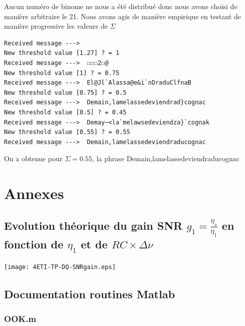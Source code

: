 \documentclass{article}
\begin{document}
\newline
Aucun numéro de binome ne nous a été distribué donc nous avons choisi de manière arbitraire le 21. \newline
Nous avons agis de manière empirique en testant de manière progressive les valeurs de $\Sigma$

\begin{verbatim}
Received message ---> 
New threshold value [1.27] ? = 1
Received message --->  ☐☐☐2☐@
New threshold value [1] ? = 0.75
Received message --->  El@Jl`Alassa@e&i`nDraduClfnaB
New threshold value [0.75] ? = 0.5
Received message --->  Demain,lamelassedeviendrad}cognac
New threshold value [0.5] ? = 0.45
Received message --->  Demay~<la`melawsedeviendza}`cognak
New threshold value [0.55] ? = 0.55
Received message --->  Demain,lamelassedeviendraducognac
\end{verbatim}
On a obtenue pour $\Sigma = 0.55$, la phrase Demain,lamelassedeviendraducognac

\section{Annexes}

\subsection{Evolution théorique du gain SNR ${\displaystyle g_1=\frac{\eta_s}{\eta_1}}$ en fonction de $\eta_1$ et de $RC \times \Delta\nu$}

\begin{center}
\texttt{[image: 4ETI-TP-DQ-SNRgain.eps]} 
\end{center}

\subsection{Documentation routines Matlab}
\label{sec:annexes-help}

\subsubsection{OOK.m}
   
\end{document}

